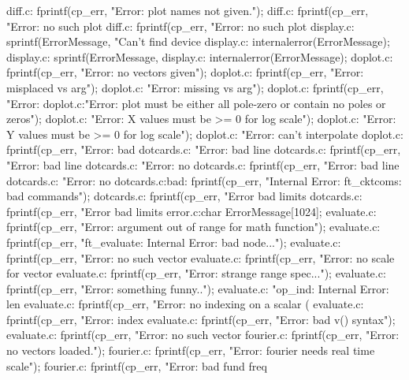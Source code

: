 {{{{{{diff.c:            fprintf(cp_err, "Error: plot names not given.\n");
diff.c:            fprintf(cp_err, "Error: no such plot %
diff.c:            fprintf(cp_err, "Error: no such plot %
display.c:    sprintf(ErrorMessage, "Can't find device %
display.c:    internalerror(ErrorMessage);
display.c:    sprintf(ErrorMessage,
display.c:    internalerror(ErrorMessage);
doplot.c:        fprintf(cp_err, "Error: no vectors given\n");
doplot.c:                fprintf(cp_err, "Error: misplaced vs arg\n");
doplot.c:                        "Error: missing vs arg\n");
doplot.c:            fprintf(cp_err, "Error: %
doplot.c:"Error: plot must be either all pole-zero or contain no poles or zeros\n");
doplot.c:            "Error: X values must be >= 0 for log scale\n");
doplot.c:            "Error: Y values must be >= 0 for log scale\n");
doplot.c:                "Error: can't interpolate %
doplot.c:    fprintf(cp_err, "Error: bad %
dotcards.c:                        "Error: bad line %
dotcards.c:                    fprintf(cp_err, "Error: bad line %
dotcards.c:                        "Error: no %
dotcards.c:                    fprintf(cp_err, "Error: bad line %
dotcards.c:                        "Error: no %
dotcards.c:bad:    fprintf(cp_err, "Internal Error: ft_cktcoms: bad commands\n");
dotcards.c:                fprintf(cp_err, "Error bad limits %
dotcards.c:                fprintf(cp_err, "Error bad limits %
error.c:char ErrorMessage[1024];
evaluate.c:    fprintf(cp_err, "Error: argument out of range for math function\n");
evaluate.c:        fprintf(cp_err, "ft_evaluate: Internal Error: bad node...\n");
evaluate.c:        fprintf(cp_err, "Error: no such vector %
evaluate.c:        fprintf(cp_err, "Error: no scale for vector %
evaluate.c:        fprintf(cp_err, "Error: strange range spec...\n");
evaluate.c:        fprintf(cp_err, "Error: something funny..\n");
evaluate.c:                "op_ind: Internal Error: len %
evaluate.c:            fprintf(cp_err, "Error: no indexing on a scalar (%
evaluate.c:        fprintf(cp_err, "Error: index %
evaluate.c:            fprintf(cp_err, "Error: bad v() syntax\n");
evaluate.c:            fprintf(cp_err, "Error: no such vector %
fourier.c:        fprintf(cp_err, "Error: no vectors loaded.\n");
fourier.c:        fprintf(cp_err, "Error: fourier needs real time scale\n");
fourier.c:        fprintf(cp_err, "Error: bad fund freq %
}}}}}}

